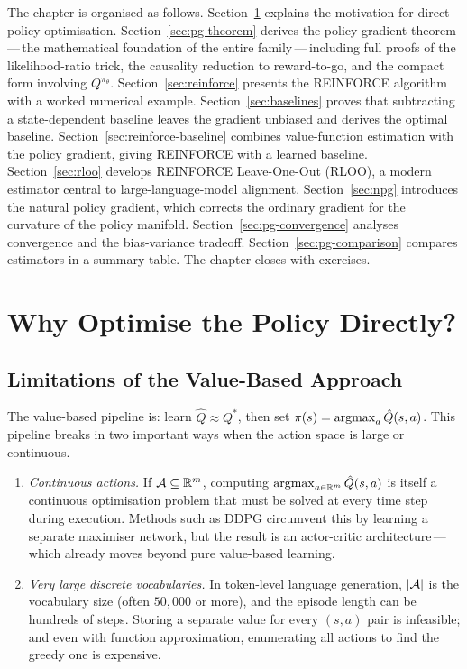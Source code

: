 The chapter is organised as follows.  Section~\ref{sec:pg-why} explains the motivation for direct policy optimisation.  Section~\ref{sec:pg-theorem} derives the policy gradient theorem\,---\,the mathematical foundation of the entire family\,---\,including full proofs of the likelihood-ratio trick, the causality reduction to reward-to-go, and the compact form involving $Q^{\pi_\theta}$.  Section~\ref{sec:reinforce} presents the REINFORCE algorithm with a worked numerical example.  Section~\ref{sec:baselines} proves that subtracting a state-dependent baseline leaves the gradient unbiased and derives the optimal baseline.  Section~\ref{sec:reinforce-baseline} combines value-function estimation with the policy gradient, giving REINFORCE with a learned baseline.  Section~\ref{sec:rloo} develops REINFORCE Leave-One-Out (RLOO), a modern estimator central to large-language-model alignment.  Section~\ref{sec:npg} introduces the natural policy gradient, which corrects the ordinary gradient for the curvature of the policy manifold.  Section~\ref{sec:pg-convergence} analyses convergence and the bias-variance tradeoff.  Section~\ref{sec:pg-comparison} compares estimators in a summary table.  The chapter closes with exercises.

\section{Why Optimise the Policy Directly?}
\label{sec:pg-why}

\subsection{Limitations of the Value-Based Approach}

The value-based pipeline is: learn $\hat Q \approx Q^*$, then set $\pi(s) = \operatorname*{argmax}_a \hat Q(s,a)$.  This pipeline breaks in two important ways when the action space is large or continuous.

\begin{enumerate}[leftmargin=*]
\item \textit{Continuous actions.}  If $\mathcal{A} \subseteq \mathbb{R}^m$, computing $\operatorname*{argmax}_{a \in \mathbb{R}^m} \hat Q(s,a)$ is itself a continuous optimisation problem that must be solved at every time step during execution.  Methods such as DDPG circumvent this by learning a separate maximiser network, but the result is an actor-critic architecture\,---\,which already moves beyond pure value-based learning.

\item \textit{Very large discrete vocabularies.}  In token-level language generation, $|\mathcal{A}|$ is the vocabulary size (often $50{,}000$ or more), and the episode length can be hundreds of steps.  Storing a separate value for every $(s,a)$ pair is infeasible; and even with function approximation, enumerating all actions to find the greedy one is expensive.
\end{enumerate}

